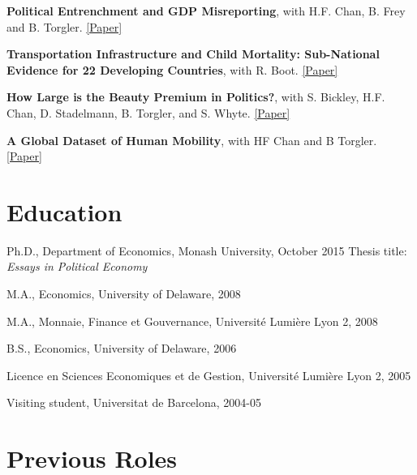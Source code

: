 \documentclass[letterpaper]{article}
\renewenvironment{itemize}{
  \begin{list}{}{
    \setlength{\leftmargin}{1.5em}
  }
}{
  \end{list}
}
\begin{document}
\begin{itemize}
	\item {\bf Political Entrenchment and GDP Misreporting}, with H.F. Chan, B. Frey and B. Torgler. 
 \href{https://www.cesifo.org/DocDL/cesifo1_wp7653.pdf}{[Paper]}
	

		\medskip


		\item \textbf{Transportation Infrastructure and Child Mortality: Sub-National Evidence for 22 Developing Countries}, with R. Boot.  \href{https://ahmedskali.com/papers/TransportationCM.pdf}{[Paper]}
								
				\medskip	

	\item \textbf{How Large is the Beauty Premium in Politics?}, with S. Bickley, H.F. Chan, D. Stadelmann, B. Torgler, and S. Whyte.  \href{https://papers.ssrn.com/sol3/papers.cfm?abstract_id=4273311}{[Paper]}
 
				\medskip

	

\item \textbf{A Global Dataset of Human Mobility}, with HF Chan and B Torgler. \href{https://drive.google.com/file/d/1\_0UwLGb5UwmHztSybZu\_1er8125UCmy0/view}{[Paper]}	


 
\end{itemize}


\section*{Education}

\begin{itemize}
	\item Ph.D., Department of Economics, Monash University, October 2015
	\subitem Thesis title: {\emph{Essays in Political Economy}}
	\item M.A., Economics, University of Delaware, 2008 
	\item M.A., Monnaie, Finance et Gouvernance, Universit\'e Lumi\`ere Lyon 2, 2008
	\item B.S., Economics, University of Delaware, 2006
	\item Licence en Sciences Economiques et de Gestion, Universit\'e Lumi\`ere Lyon 2, 2005
	\item Visiting student, Universitat de Barcelona, 2004-05
\end{itemize}

\section*{ Previous Roles}
\end{document}
